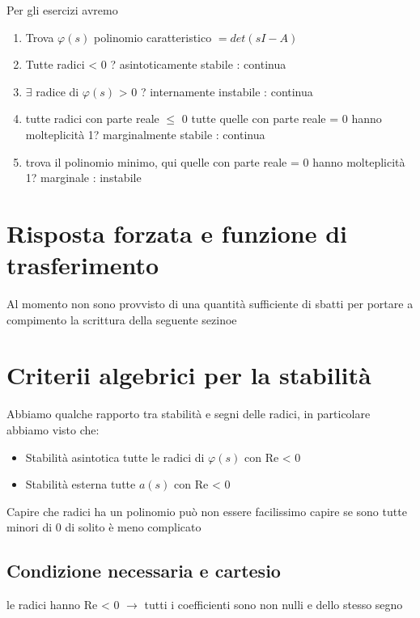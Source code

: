 \documentclass[11pt]{article}
\begin{document}
Per gli esercizi avremo
\begin{enumerate}
\item Trova \(\varphi (s)\) polinomio caratteristico \(= det(sI - A)\)
\item Tutte radici < 0 ? asintoticamente stabile : continua
\item \(\exists\) radice di \(\varphi (s)\) > 0 ? internamente instabile : continua
\item tutte radici con parte reale \(\le\) 0
tutte quelle con parte reale = 0 hanno molteplicità 1? marginalmente
stabile : continua
\item trova il polinomio minimo, qui quelle con parte reale = 0 hanno
molteplicità 1? marginale : instabile
\end{enumerate}

\section{Risposta forzata e funzione di trasferimento}
\label{sec:orgc58d54b}

Al momento non sono provvisto di una quantità sufficiente di sbatti
per portare a compimento la scrittura della seguente sezinoe

\section{Criterii algebrici per la stabilità}
\label{sec:org3546042}

Abbiamo qualche rapporto tra stabilità e segni delle radici, in particolare
abbiamo visto che:

\begin{itemize}
\item Stabilità asintotica \iff tutte le radici di \(\varphi (s)\) con Re < 0
\item Stabilità esterna \iff tutte \(a(s)\) con Re < 0
\end{itemize}

Capire che radici ha un polinomio può non essere facilissimo
capire se sono tutte minori di 0 di solito è meno complicato

\subsection{Condizione necessaria e cartesio}
\label{sec:org49dcdea}

le radici hanno Re < 0 \(\to\) tutti i coefficienti sono non nulli e dello stesso
segno
\end{document}
